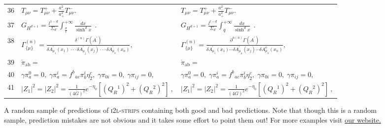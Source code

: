 \documentclass{article}
\newcommand{\website}{https://untrix.github.io/i2l/}
\begin{document}
\begin{figure*}[p]
\begin{tabular}{lll}
\scriptsize{36} & $\scriptstyle{T _ { \mu \nu } = T _ { \mu \nu } ^ { + } + \frac { a _ { - } ^ { 2 } } { a _ { + } ^ { 2 } } T _ { \mu \nu } ^ { - } . }$ & $\scriptstyle{T _ { \mu \nu } = T _ { \mu \nu } ^ { + } + \frac { a _ { - } ^ { 2 } } { a _ { + } ^ { 2 } } T _ { \mu \nu } ^ { - } . }$\\
\scriptsize{37} & $\scriptstyle{G _ { H ^ { d + 1 } } = { \frac { l ^ { 1 - d } } { \Sigma _ { d } } } \int _ { \frac { \sigma } { l } } ^ { + \infty } { \frac { d x } { \operatorname { s i n h } ^ { d } x } } ~ ~ . }$ & $\scriptstyle{G _ { H ^ { d + 1 } } = \frac { l ^ { l - d } } { \Sigma _ { d } } \int _ { q } ^ { + \infty } \frac { d x } { \operatorname { s i n h } ^ { d } x } ~ ~ . }$\\
\scriptsize{38} & $\scriptstyle{\Gamma _ { \{ \mu \} } ^ { ( n ) } = { \frac { \delta ^ { ( n ) } \Gamma ( A ^ { \prime } ) } { \delta A _ { \mu _ { 1 } } ^ { \prime } ( x _ { 1 } ) \cdot \cdot \cdot \delta A _ { \mu _ { j } } ^ { \prime } ( x _ { j } ) \cdot \cdot \cdot \delta A _ { \mu _ { n } } ^ { \prime } ( x _ { n } ) } } , }$ & $\scriptstyle{\Gamma _ { \{ \mu \} } ^ { ( n ) } = \frac { \partial ^ { n ( n ) } \Gamma ( A ^ { \prime } ) } { \delta A _ { \mu _ { 1 } } ^ { \prime } ( x _ { 1 } ) \cdots \delta A _ { \mu _ { \mu } } ^ { \prime } ( x _ { j } ) \cdots \delta A _ { \mu _ { n } } ^ { o } ( x _ { n } ) } , }$\\
\scriptsize{39} & $\scriptstyle{\dot { \pi } _ { \mathrm { a b } } = }$ & $\scriptstyle{\dot { \pi } _ { \mathrm { a b } } = }$\\
\scriptsize{40} & $\scriptstyle{\gamma \pi _ { a } ^ { 0 } = 0 , \; \gamma \pi _ { a } ^ { i } = f _ { \; \; a c } ^ { b } \pi _ { b } ^ { i } \eta _ { 2 } ^ { c } , \; \gamma \pi _ { 0 i } = 0 , \; \gamma \pi _ { i j } = 0 , }$ & $\scriptstyle{\gamma \pi _ { a } ^ { 0 } = 0 , \; \gamma \pi _ { a } ^ { i } = f _ { \; \; a c } ^ { b } \pi _ { b } ^ { i } \eta _ { 2 } ^ { c } , \; \gamma \pi _ { 0 i } = 0 , \; \gamma \pi _ { i j } = 0 , }$\\
\scriptsize{41} & $\scriptstyle{| Z _ { 1 } | ^ { 2 } = | Z _ { 2 } | ^ { 2 } = { \frac { 1 } { ( 4 G ) ^ { 2 } } } e ^ { - \eta _ { 0 } } [ ( Q _ { R } { } ^ { 1 } ) ^ { 2 } + ( Q _ { R } { } ^ { 2 } ) ^ { 2 } ] \ , }$ & $\scriptstyle{| Z _ { 1 } | ^ { 2 } = | Z _ { 2 } | ^ { 2 } = \frac { 1 } { ( 4 G ) ^ { 2 } } e ^ { - \eta _ { 0 } } [ ( Q _ { R } { } ^ { 1 } ) ^ { 2 } + ( Q _ { R } { } ^ { 2 } ) ^ { 2 } ] \ , }$\\
 	\end{tabular}
	\centering
	\caption[Random Sample of Predictions]{A random sample of predictions of \textsc{i2l-strips} containing both good and bad predictions. Note that though this is a random sample, prediction mistakes are not obvious and it takes some effort to point them out! For more examples visit \href{\website}{our website.}\footnotemark[105]}
	\label{fig-rand-preds}
\end{figure*}
\end{document}
